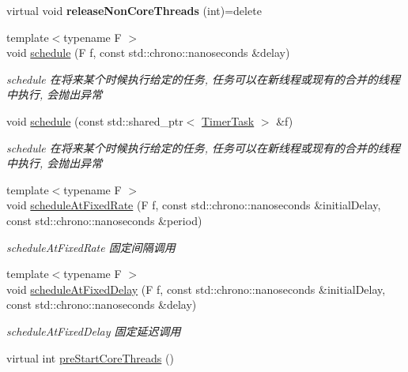 \begin{DoxyCompactItemize}
\item 
\mbox{\label{classScheduledThreadPoolExecutor_a1c31bc114b95b8ea8db057e7dcd922a9}} 
virtual void {\bfseries release\+Non\+Core\+Threads} (int)=delete
\item 
{\footnotesize template$<$typename F $>$ }\\void \hyperlink{classScheduledThreadPoolExecutor_a45e622833714db87a86d50eb45c8f338}{schedule} (F f, const std\+::chrono\+::nanoseconds \&delay)
\begin{DoxyCompactList}\small\item\em schedule 在将来某个时候执行给定的任务, 任务可以在新线程或现有的合并的线程中执行, 会抛出异常 \end{DoxyCompactList}\item 
void \hyperlink{classScheduledThreadPoolExecutor_a30f723414e619a950f1efd968d13921d}{schedule} (const std\+::shared\+\_\+ptr$<$ \hyperlink{structTimerTask}{Timer\+Task} $>$ \&f)
\begin{DoxyCompactList}\small\item\em schedule 在将来某个时候执行给定的任务, 任务可以在新线程或现有的合并的线程中执行, 会抛出异常 \end{DoxyCompactList}\item 
{\footnotesize template$<$typename F $>$ }\\void \hyperlink{classScheduledThreadPoolExecutor_aebcb96fcb3f5bfc6e55ffcef9f38d60b}{schedule\+At\+Fixed\+Rate} (F f, const std\+::chrono\+::nanoseconds \&initial\+Delay, const std\+::chrono\+::nanoseconds \&period)
\begin{DoxyCompactList}\small\item\em schedule\+At\+Fixed\+Rate 固定间隔调用 \end{DoxyCompactList}\item 
{\footnotesize template$<$typename F $>$ }\\void \hyperlink{classScheduledThreadPoolExecutor_a594bb3111f9d051ad12f366a13a54db0}{schedule\+At\+Fixed\+Delay} (F f, const std\+::chrono\+::nanoseconds \&initial\+Delay, const std\+::chrono\+::nanoseconds \&delay)
\begin{DoxyCompactList}\small\item\em schedule\+At\+Fixed\+Delay 固定延迟调用 \end{DoxyCompactList}\item 
virtual int \hyperlink{classScheduledThreadPoolExecutor_aed48379bdc243fd07e593205ca28f48d}{pre\+Start\+Core\+Threads} ()

\end{DoxyCompactItemize}
